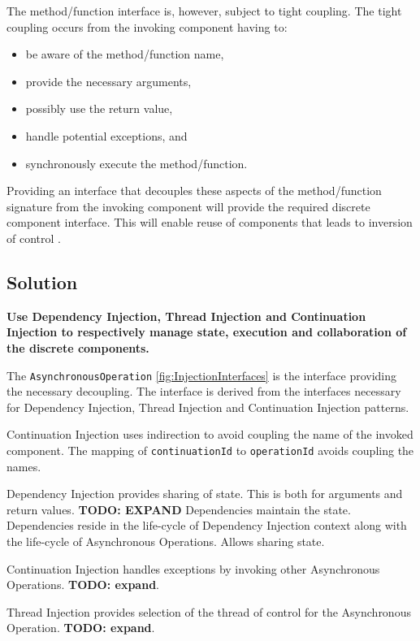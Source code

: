 \documentclass[prodmode]{style/acmlarge}
\begin{document}
The method/function interface is, however, subject to tight coupling.  The tight
coupling occurs from the invoking component having to:
\begin{itemize}
  \item be aware of the method/function name,
  \item provide the necessary arguments,
  \item possibly use the return value,
  \item handle potential exceptions, and
  \item synchronously execute the method/function.
\end{itemize}

Providing an interface that decouples these aspects of the method/function
signature from the invoking component will provide the required discrete
component interface. This will enable reuse of components that leads to
inversion of control \cite[p. 27]{gof}.


\subsection{Solution}

\textbf{Use Dependency Injection, Thread Injection and Continuation Injection to respectively manage state, execution and collaboration of the discrete components.}

The \texttt{AsynchronousOperation} \ref{fig:InjectionInterfaces} is the
interface providing the necessary decoupling.  The interface is derived from the
interfaces necessary for Dependency Injection, Thread Injection and Continuation
Injection patterns.

Continuation Injection uses indirection to avoid coupling the name of the
invoked component.  The mapping of \texttt{continuationId} to
\texttt{operationId} avoids coupling the names.

Dependency Injection provides sharing of state.  This is both for arguments and
return values. \textbf{TODO: EXPAND} Dependencies maintain the state. 
Dependencies reside in the life-cycle of Dependency Injection context along with
the life-cycle of Asynchronous Operations.  Allows sharing state.

Continuation Injection handles exceptions by invoking other Asynchronous Operations. \textbf{TODO: expand}. 

Thread Injection provides selection of the thread of control for the Asynchronous Operation. \textbf{TODO: expand}.
\end{document}

